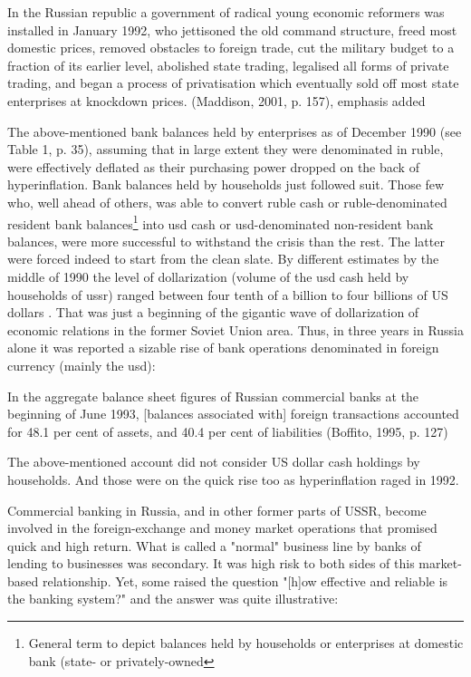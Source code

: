 In the Russian republic a government of radical young economic reformers was installed in January 1992, who jettisoned the old command structure, freed most domestic prices, removed obstacles to foreign trade, cut the military budget to a fraction of its earlier level, abolished state trading, legalised all forms of private trading, and began a process of privatisation which eventually sold off most state enterprises at knockdown prices. 
(Maddison, 2001, p. 157), emphasis added

The above-mentioned bank balances held by enterprises as of December 1990 (see Table 1, p. 35), assuming that in large extent they were denominated in ruble, were effectively deflated as their purchasing power dropped on the back of hyperinflation. Bank balances held by households just followed suit. Those few who, well ahead of others, was able to convert ruble cash or ruble-denominated resident bank balances\footnote{General term to depict balances held by households or enterprises at domestic bank (state- or privately-owned} into \acf{usd} cash or \ac{usd}-denominated non-resident bank balances, were more successful to withstand the crisis than the rest. The latter were forced indeed to start from the clean slate. By different estimates by the middle of 1990 the level of dollarization (volume of the \acf{usd} cash held by households of \ac{ussr}) ranged between four tenth of a billion to four billions of US dollars \citep[p.~92]{peck1991}. That was just a beginning of the gigantic wave of dollarization of economic relations in the former Soviet Union area. Thus, in three years in Russia alone it was reported a sizable rise of bank operations denominated in foreign currency (mainly the \acf{usd}):

In the aggregate balance sheet figures of Russian commercial banks at the beginning of June 1993, [balances associated with] foreign transactions accounted for 48.1 per cent of assets, and 40.4 per cent of liabilities (Boffito, 1995, p. 127)

The above-mentioned account did not consider US dollar cash holdings by households. And those were on the quick rise too as hyperinflation raged in 1992.

Commercial banking in Russia, and in other former parts of USSR, become involved in the foreign-exchange and money market operations that promised quick and high return. What is called a "normal" business line by banks of lending to businesses was secondary. It was high risk to both sides of this market-based relationship. Yet, some raised the question "[h]ow effective and reliable is the banking system?" \citep[p.~61]{varese2001} and the answer was quite illustrative:

